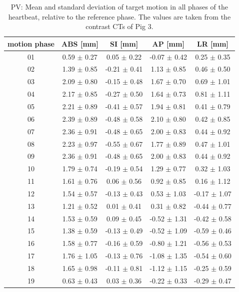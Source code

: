 \documentclass[type=dr, dr=rernat, accentcolor=tud7b,colorbacktitle, bigchapter, openright, twoside, 12pt ]{tudthesis}
\begin{document}
\newpage

\begin{table}[H]
  \centering
  \scriptsize
  \caption{PV: Mean and standard deviation of target motion in all phases of the heartbeat, relative to the reference phase. The values are 
  taken from the contrast CTs of Pig 3.}
  \begin{tabular}{|c|c|c|c|c|}
    \hline\hline
    motion phase\rule{0pt}{2.6ex}\rule[-1.2ex]{0pt}{0pt} & ABS [mm] & SI [mm] & AP [mm] & LR [mm]\\
    \hline
01 &0.59 $\pm$ 0.27 &0.05 $\pm$ 0.22 &-0.07 $\pm$ 0.42 &0.25 $\pm$ 0.35 \\
02 &1.39 $\pm$ 0.85 &-0.21 $\pm$ 0.41 &1.13 $\pm$ 0.85 &0.46 $\pm$ 0.50 \\
03 &2.09 $\pm$ 0.80 &-0.15 $\pm$ 0.48 &1.67 $\pm$ 0.70 &0.69 $\pm$ 1.01 \\
04 &2.17 $\pm$ 0.85 &-0.27 $\pm$ 0.50 &1.64 $\pm$ 0.73 &0.81 $\pm$ 1.11 \\
05 &2.21 $\pm$ 0.89 &-0.41 $\pm$ 0.57 &1.94 $\pm$ 0.81 &0.41 $\pm$ 0.79 \\
06 &2.39 $\pm$ 0.89 &-0.48 $\pm$ 0.58 &2.10 $\pm$ 0.80 &0.42 $\pm$ 0.85 \\
07 &2.36 $\pm$ 0.91 &-0.48 $\pm$ 0.65 &2.00 $\pm$ 0.83 &0.44 $\pm$ 0.92 \\
08 &2.23 $\pm$ 0.97 &-0.55 $\pm$ 0.67 &1.77 $\pm$ 0.89 &0.47 $\pm$ 1.01 \\
09 &2.36 $\pm$ 0.91 &-0.48 $\pm$ 0.65 &2.00 $\pm$ 0.83 &0.44 $\pm$ 0.92 \\
10 &1.79 $\pm$ 0.74 &-0.19 $\pm$ 0.54 &1.29 $\pm$ 0.77 &0.32 $\pm$ 1.03 \\
11 &1.61 $\pm$ 0.76 &0.06 $\pm$ 0.56 &0.92 $\pm$ 0.85 &0.16 $\pm$ 1.12 \\
12 &1.54 $\pm$ 0.57 &-0.13 $\pm$ 0.43 &0.53 $\pm$ 1.03 &-0.17 $\pm$ 1.07 \\
13 &1.21 $\pm$ 0.52 &0.01 $\pm$ 0.41 &0.31 $\pm$ 0.82 &-0.44 $\pm$ 0.77 \\
14 &1.53 $\pm$ 0.59 &0.09 $\pm$ 0.45 &-0.52 $\pm$ 1.31 &-0.42 $\pm$ 0.58 \\
15 &1.38 $\pm$ 0.59 &-0.13 $\pm$ 0.49 &-0.52 $\pm$ 1.09 &-0.59 $\pm$ 0.46 \\
16 &1.58 $\pm$ 0.77 &-0.16 $\pm$ 0.59 &-0.80 $\pm$ 1.21 &-0.56 $\pm$ 0.53 \\
17 &1.76 $\pm$ 1.05 &-0.13 $\pm$ 0.76 &-1.08 $\pm$ 1.35 &-0.54 $\pm$ 0.60 \\
18 &1.65 $\pm$ 0.98 &-0.11 $\pm$ 0.81 &-1.12 $\pm$ 1.15 &-0.25 $\pm$ 0.59 \\
19 &0.63 $\pm$ 0.43 &0.03 $\pm$ 0.36 &-0.22 $\pm$ 0.33 &-0.29 $\pm$ 0.47 \\
    \hline\hline
  \end{tabular}
  \label{tab:motion:PV:Pig3}
\end{table}
\end{document}
